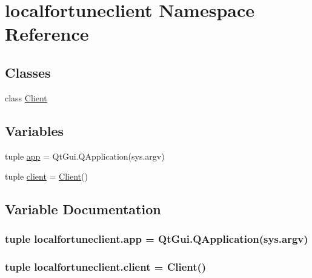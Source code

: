 \hypertarget{namespacelocalfortuneclient}{}\section{localfortuneclient Namespace Reference}
\label{namespacelocalfortuneclient}
\subsection*{Classes}
\begin{DoxyCompactItemize}
\item 
class \hyperlink{classlocalfortuneclient_1_1Client}{Client}
\end{DoxyCompactItemize}
\subsection*{Variables}
\begin{DoxyCompactItemize}
\item 
tuple \hyperlink{namespacelocalfortuneclient_a0112382aa0ace25d78126af47a41991d}{app} = Qt\+Gui.\+Q\+Application(sys.\+argv)
\item 
tuple \hyperlink{namespacelocalfortuneclient_aaa0113796a35bd80c7b8377065bd035e}{client} = \hyperlink{classlocalfortuneclient_1_1Client}{Client}()
\end{DoxyCompactItemize}


\subsection{Variable Documentation}
\hypertarget{namespacelocalfortuneclient_a0112382aa0ace25d78126af47a41991d}{}
\subsubsection[{app}]{\setlength{\rightskip}{0pt plus 5cm}tuple localfortuneclient.\+app = Qt\+Gui.\+Q\+Application(sys.\+argv)}\label{namespacelocalfortuneclient_a0112382aa0ace25d78126af47a41991d}
\hypertarget{namespacelocalfortuneclient_aaa0113796a35bd80c7b8377065bd035e}{}
\subsubsection[{client}]{\setlength{\rightskip}{0pt plus 5cm}tuple localfortuneclient.\+client = {\bf Client}()}\label{namespacelocalfortuneclient_aaa0113796a35bd80c7b8377065bd035e}
